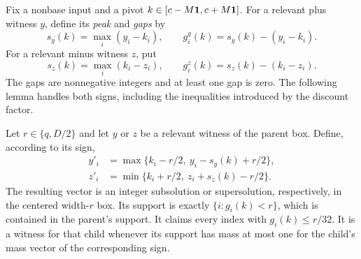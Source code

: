 Fix a nonbase input and a pivot $k\in[c-M\mathbf 1,c+M\mathbf 1]$.
For a relevant plus witness $y$, define its \emph{peak} and
\emph{gaps} by
\begin{equation}
 s_y(k)=\max_i(y_i-k_i),\qquad
 g_i^y(k)=s_y(k)-(y_i-k_i).
 \label{eq:label-plus-gaps}
\end{equation}
For a relevant minus witness $z$, put
\begin{equation}
 s_z(k)=\max_i(k_i-z_i),\qquad
 g_i^z(k)=s_z(k)-(k_i-z_i).
 \label{eq:label-minus-gaps}
\end{equation}
The gaps are nonnegative integers and at least one gap is zero.
The following lemma handles both signs, including the inequalities
introduced by the discount factor.

\begin{lemma}
\label{lem:label-translation}
Let $r\in\{q,D/2\}$ and let $y$ or $z$ be a relevant witness
of the parent box.  Define, according to its sign,
\begin{equation}
 \begin{aligned}
 y'_i&=\max\{k_i-r/2,\ y_i-s_y(k)+r/2\},\\
 z'_i&=\min\{k_i+r/2,\ z_i+s_z(k)-r/2\}.
 \end{aligned}
 \label{eq:label-translation}
\end{equation}
The resulting vector is an integer subsolution or supersolution,
respectively, in the centered width-$r$ box.  Its support is exactly
$\{i:g_i(k)<r\}$, which is contained in the parent's support.
It claims every index with $g_i(k)\le r/32$.  It is a witness
for that child whenever its support has mass at most one for the
child's mass vector of the corresponding sign.
\end{lemma}

